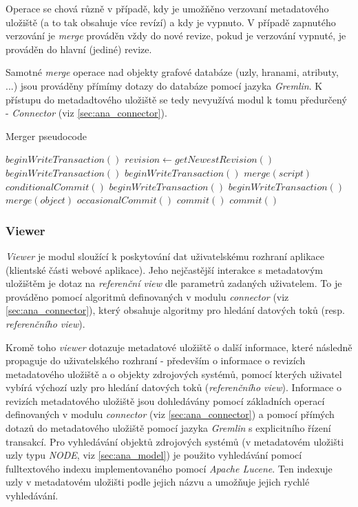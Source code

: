 Operace se chová různě v případě, kdy je umožňěno verzovaní metadatového uložiště (a to tak obsahuje více revízí) a kdy je vypnuto. V případě zapnutého verzování je \textit{merge} prováděn vždy do nové revize, pokud je verzování vypnuté, je prováděn do hlavní (jediné) revize. 

Samotné \textit{merge} operace nad objekty grafové databáze (uzly, hranami, atributy, ...) jsou prováděny přímímy dotazy do databáze pomocí jazyka \textit{Gremlin}. K přístupu do metadadtového uložiště se tedy nevyužívá modul k tomu předurčený - \textit{Connector} (viz \ref{sec:ana_connector}).

\begin{algorithm} 
\caption{Merger pseudocode}
\label{alg_merger}
\begin{algorithmic}
	\State $beginWriteTransaction()$
	\State $revision\gets getNewestRevision()$
		\State $beginWriteTransaction()$
			\State $beginWriteTransaction()$
			\State $merge(script)$	
			\State $conditionalCommit()$
		\EndFor
		\State $beginWriteTransaction()$
			\State $beginWriteTransaction()$
			\State $merge(object)$	
			\State $occasionalCommit()$
		\EndFor
		\State $commit()$	
	\EndIf
	\State $commit()$
\end{algorithmic}
\end{algorithm}

\subsubsection{Viewer}
\label{sec:ana_viewer}
\textit{Viewer} je modul sloužící k poskytování dat uživatelskému rozhraní aplikace (klientské části webové aplikace). Jeho nejčastější interakce s metadatovým uložištěm je dotaz na \textit{referenční view} dle parametrů zadaných uživatelem. To je prováděno pomocí algoritmů definovaných v modulu \textit{connector} (viz \ref{sec:ana_connector}), který obsahuje algoritmy pro hledání datových toků (resp. \textit{referenčního view}).

Kromě toho \textit{viewer} dotazuje metadatové uložiště o další informace, které následně propaguje do uživatelského rozhraní - především o informace o revizích metadatového uložiště a o objekty zdrojových systémů, pomocí kterých uživatel vybírá výchozí uzly pro hledání datových toků (\textit{referenčního view}). Informace o revizích metadatového uložiště jsou dohledávány pomocí základních operací definovaných v modulu \textit{connector} (viz \ref{sec:ana_connector}) a pomocí přímých dotazů do metadatového uložiště pomocí jazyka \textit{Gremlin} s explicitního řízení transakcí. Pro vyhledávání objektů zdrojových systémů (v metadatovém uložišti uzly typu \textit{NODE}, viz \ref{sec:ana_model}) je použito vyhledávání pomocí fulltextového indexu implementovaného pomocí \textit{Apache Lucene}. Ten indexuje uzly v metadatovém uložišti podle jejich názvu a umožňuje jejich rychlé vyhledávání. 



